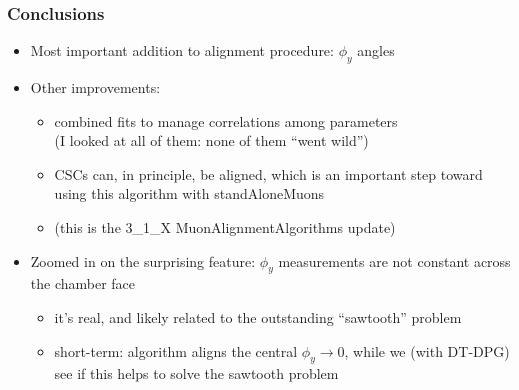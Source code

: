 \documentclass[compress]{beamer}
\begin{document}
\begin{frame}
\frametitle{Conclusions}

\begin{itemize}
\item Most important addition to alignment procedure: $\phi_y$ angles
\item Other improvements:
\begin{itemize}
\item combined fits to manage correlations among parameters \\ (I looked at all of them: none of them ``went wild'')
\item CSCs can, in principle, be aligned, which is an important step toward using this algorithm with standAloneMuons
\item (this is the 3\_1\_X MuonAlignmentAlgorithms update)
\end{itemize}
\item Zoomed in on the surprising feature: $\phi_y$ measurements are not constant across the chamber face
\begin{itemize}
\item it's real, and likely related to the outstanding ``sawtooth'' problem
\item short-term: algorithm aligns the central $\phi_y \to 0$, while we (with DT-DPG) see if this helps to solve the sawtooth problem
\end{itemize}
\end{itemize}

\label{numpages}
\end{frame}
\end{document}
